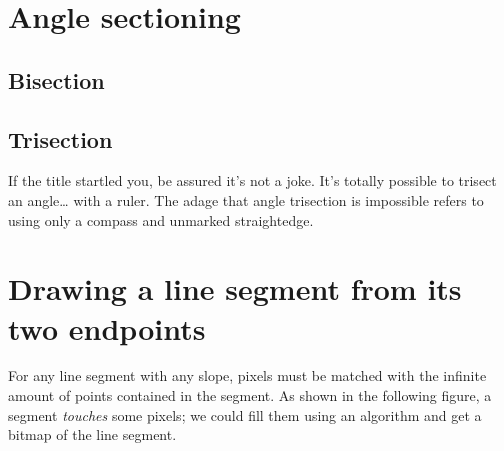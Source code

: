 \documentclass[12pt,openany,a4,usenames,dvipsnames]{book}
\newcommand\bitmap{{\pixelfont{}bitmap}}
\newcommand\pixels{{\pixelfont{}pixels}}
\begin{document}
\chapter{Angle sectioning}
\section{Bisection}
\skelpar%
\section{Trisection}
If the title startled you, be assured it's not a joke. It's totally possible to trisect an angle\ldots{} with a ruler. The adage that angle trisection is impossible refers to using only a compass and unmarked straightedge.

\skelpar%
\clearpage{}
\chapter{Drawing a line segment from its two endpoints}

For any line segment with any slope, \pixels{} must be matched with the infinite
amount of points contained in the segment. As shown in the following figure, a segment \emph{touches} some \pixels{}; we could fill them using an algorithm and get a \bitmap{} of the line segment.

\begin{figure}[H]
\centering

\end{figure}
\end{document}
